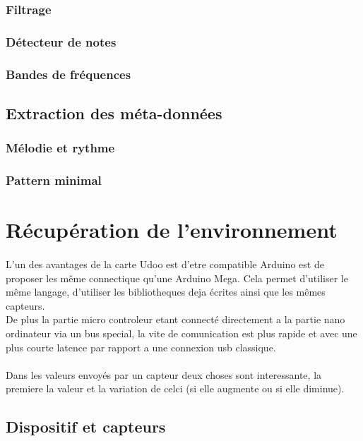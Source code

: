 \documentclass[a4paper, titlepage, oneside, 12pt]{article}%
\begin{document}
\subsubsection{Filtrage}
\subsubsection{Détecteur de notes}
\subsubsection{Bandes de fréquences}

\subsection{Extraction des méta-données}
\subsubsection{Mélodie et rythme}
\subsubsection{Pattern minimal}

\newpage
\section{Récupération de l'environnement}
\paragraph{}
L'un des avantages de la carte Udoo est d'etre compatible Arduino est de proposer les même connectique qu'une Arduino Mega. Cela permet d'utiliser le même langage, d'utiliser les bibliotheques deja écrites ainsi que les mêmes capteurs.\\
De plus la partie  micro controleur etant connecté directement a la partie nano ordinateur via un bus special, la vite de comunication est plus rapide et avec une plus courte latence par rapport a une connexion usb classique.

\paragraph{}
Dans les valeurs envoyés par un capteur deux choses sont interessante, la premiere la valeur et la variation de celci (si elle augmente ou si elle diminue).
\subsection{Dispositif et capteurs}
\end{document}
